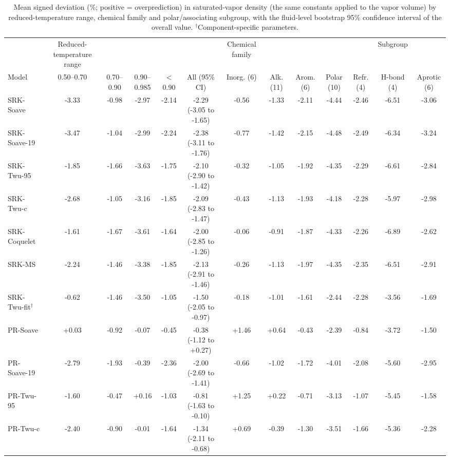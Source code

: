 \begin{table}[H]
\centering
\caption{Mean signed deviation (\%; positive = overprediction) in saturated-vapor density (the same constants applied to the vapor volume) by reduced-temperature range, chemical family and polar/associating subgroup, with the fluid-level bootstrap 95\% confidence interval of the overall value. $^{\dagger}$Component-specific parameters.}
\label{tab:tabS_signed_rhov}
\small
\begin{tabular}{lcccccccccccc}
\toprule
 & Reduced-temperature range &  &  &  &  & Chemical family &  &  &  &  & Subgroup &  \\
Model & 0.50--0.70 & 0.70--0.90 & 0.90--0.985 & < 0.90 & All (95\% CI) & Inorg. (6) & Alk. (11) & Arom. (6) & Polar (10) & Refr. (4) & H-bond (4) & Aprotic (6) \\
\midrule
SRK-Soave & -3.33 & -0.98 & -2.97 & -2.14 & -2.29 (-3.05 to -1.65) & -0.56 & -1.33 & -2.11 & -4.44 & -2.46 & -6.51 & -3.06 \\
SRK-Soave-19 & -3.47 & -1.04 & -2.99 & -2.24 & -2.38 (-3.11 to -1.76) & -0.77 & -1.42 & -2.15 & -4.48 & -2.49 & -6.34 & -3.24 \\
SRK-Twu-95 & -1.85 & -1.66 & -3.63 & -1.75 & -2.10 (-2.90 to -1.42) & -0.32 & -1.05 & -1.92 & -4.35 & -2.29 & -6.61 & -2.84 \\
SRK-Twu-c & -2.68 & -1.05 & -3.16 & -1.85 & -2.09 (-2.83 to -1.47) & -0.43 & -1.13 & -1.93 & -4.18 & -2.28 & -5.97 & -2.98 \\
SRK-Coquelet & -1.61 & -1.67 & -3.61 & -1.64 & -2.00 (-2.85 to -1.26) & -0.06 & -0.91 & -1.87 & -4.33 & -2.26 & -6.89 & -2.62 \\
SRK-MS & -2.24 & -1.46 & -3.38 & -1.85 & -2.13 (-2.91 to -1.46) & -0.26 & -1.13 & -1.97 & -4.35 & -2.35 & -6.51 & -2.91 \\
SRK-Twu-fit$^{\dagger}$ & -0.62 & -1.46 & -3.50 & -1.05 & -1.50 (-2.05 to -0.97) & -0.18 & -1.01 & -1.61 & -2.44 & -2.28 & -3.56 & -1.69 \\
\midrule
PR-Soave & +0.03 & -0.92 & -0.07 & -0.45 & -0.38 (-1.12 to +0.27) & +1.46 & +0.64 & -0.43 & -2.39 & -0.84 & -3.72 & -1.50 \\
PR-Soave-19 & -2.79 & -1.93 & -0.39 & -2.36 & -2.00 (-2.69 to -1.41) & -0.66 & -1.02 & -1.72 & -4.01 & -2.08 & -5.60 & -2.95 \\
PR-Twu-95 & -1.60 & -0.47 & +0.16 & -1.03 & -0.81 (-1.63 to -0.10) & +1.25 & +0.22 & -0.71 & -3.13 & -1.07 & -5.45 & -1.58 \\
PR-Twu-c & -2.40 & -0.90 & -0.01 & -1.64 & -1.34 (-2.11 to -0.68) & +0.69 & -0.39 & -1.30 & -3.51 & -1.66 & -5.36 & -2.28 \\

\end{tabular}
\end{table}
